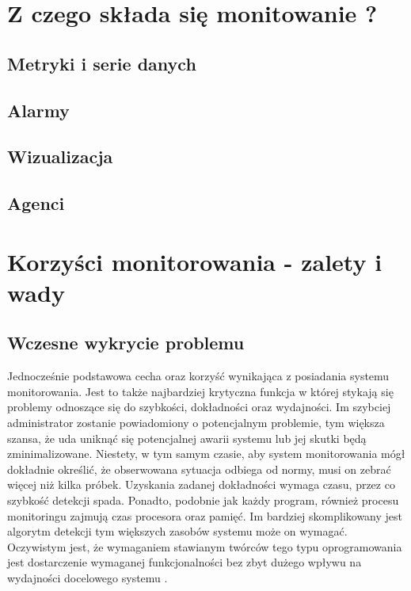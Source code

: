 \section{Z czego składa się monitowanie ?}
    \subsection{Metryki i serie danych}
    \subsection{Alarmy}
    \subsection{Wizualizacja}
    \subsection{Agenci}

\section{Korzyści monitorowania - zalety i wady}
\label{chapter:monitoring:advantages}

    \subsection{Wczesne wykrycie problemu}
    \label{chapter:monitoring:advantages:early_detection}
    Jednocześnie podstawowa cecha oraz korzyść wynikająca z posiadania systemu monitorowania. 
    Jest to także najbardziej krytyczna funkcja w której stykają się problemy odnoszące się
    do szybkości, dokładności oraz wydajności. Im szybciej administrator zostanie
    powiadomiony o potencjalnym problemie, tym większa szansa, że uda uniknąć się potencjalnej
    awarii systemu lub jej skutki będą zminimalizowane. Niestety, w tym samym czasie, 
    aby system monitorowania mógł dokładnie określić, że obserwowana sytuacja odbiega od normy,
    musi on zebrać więcej niż kilka próbek. Uzyskania zadanej dokładności wymaga czasu, 
    przez co szybkość detekcji spada. Ponadto, podobnie jak każdy program, również procesu
    monitoringu zajmują czas procesora oraz pamięć. Im bardziej skomplikowany jest algorytm
    detekcji tym większych zasobów systemu może on wymagać. Oczywistym jest, że wymaganiem
    stawianym twórców tego typu oprogramowania jest dostarczenie wymaganej funkcjonalności
    bez zbyt dużego wpływu na wydajności docelowego systemu \cite{monitoring_and_alerting}. 
    
